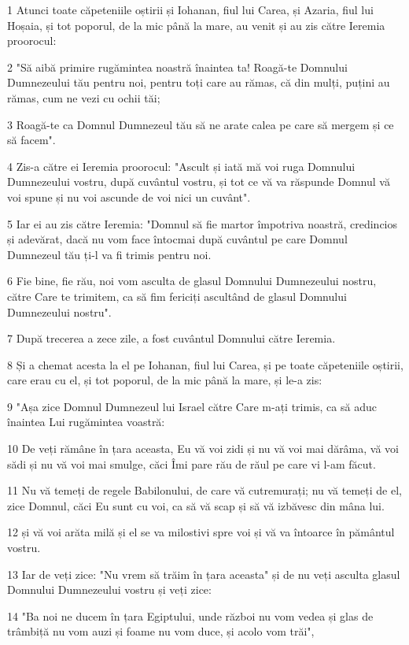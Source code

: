 \par 1 Atunci toate căpeteniile oștirii și Iohanan, fiul lui Carea, și Azaria, fiul lui Hoșaia, și tot poporul, de la mic până la mare, au venit și au zis către Ieremia proorocul:
\par 2 "Să aibă primire rugămintea noastră înaintea ta! Roagă-te Domnului Dumnezeului tău pentru noi, pentru toți care au rămas, că din mulți, puțini au rămas, cum ne vezi cu ochii tăi;
\par 3 Roagă-te ca Domnul Dumnezeul tău să ne arate calea pe care să mergem și ce să facem".
\par 4 Zis-a către ei Ieremia proorocul: "Ascult și iată mă voi ruga Domnului Dumnezeului vostru, după cuvântul vostru, și tot ce vă va răspunde Domnul vă voi spune și nu voi ascunde de voi nici un cuvânt".
\par 5 Iar ei au zis către Ieremia: "Domnul să fie martor împotriva noastră, credincios și adevărat, dacă nu vom face întocmai după cuvântul pe care Domnul Dumnezeul tău ți-l va fi trimis pentru noi.
\par 6 Fie bine, fie rău, noi vom asculta de glasul Domnului Dumnezeului nostru, către Care te trimitem, ca să fim fericiți ascultând de glasul Domnului Dumnezeului nostru".
\par 7 După trecerea a zece zile, a fost cuvântul Domnului către Ieremia.
\par 8 Și a chemat acesta la el pe Iohanan, fiul lui Carea, și pe toate căpeteniile oștirii, care erau cu el, și tot poporul, de la mic până la mare, și le-a zis:
\par 9 "Așa zice Domnul Dumnezeul lui Israel către Care m-ați trimis, ca să aduc înaintea Lui rugămintea voastră:
\par 10 De veți rămâne în țara aceasta, Eu vă voi zidi și nu vă voi mai dărâma, vă voi sădi și nu vă voi mai smulge, căci Îmi pare rău de răul pe care vi l-am făcut.
\par 11 Nu vă temeți de regele Babilonului, de care vă cutremurați; nu vă temeți de el, zice Domnul, căci Eu sunt cu voi, ca să vă scap și să vă izbăvesc din mâna lui.
\par 12 și vă voi arăta milă și el se va milostivi spre voi și vă va întoarce în pământul vostru.
\par 13 Iar de veți zice: "Nu vrem să trăim în țara aceasta" și de nu veți asculta glasul Domnului Dumnezeului vostru și veți zice:
\par 14 "Ba noi ne ducem în țara Egiptului, unde război nu vom vedea și glas de trâmbiță nu vom auzi și foame nu vom duce, și acolo vom trăi",
